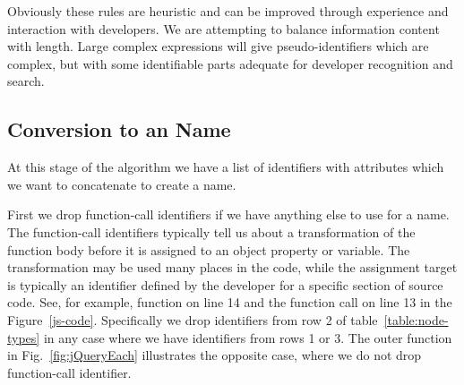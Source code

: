 \documentclass[10pt, preprint]{sigplanconf}
\begin{document}
Obviously these rules are heuristic and can be improved through experience and interaction with developers. We are attempting to balance information content with length. Large complex expressions will give pseudo-identifiers which are complex, but with some identifiable parts adequate for developer recognition and search.

\begin{table}
\centering
{}
\caption{JavaScript Expression Reduction to a Name. Expressions which match an entry in the pattern column are converted as shown in the Name column. Here \texttt{e} indicates an expression, \texttt{id} indicates an identifier, \texttt{+} means string concatenation and \texttt{Name()} means we apply the pattern matching recursively.}
\label{expression-reduction} 
\end{table}    

\subsection{Conversion to an Name}
\label{sec:concatenation}
At this stage of the algorithm we have a list of identifiers with attributes which we want to concatenate to create a name. 

First we drop function-call identifiers if we have anything else to use for a name. The function-call identifiers typically tell us about a transformation of the function body before it is assigned to an object property or variable. The transformation may be used many places in the code, while the assignment target is typically an identifier defined by the developer for a specific section of source code.  See, for example, function on line 14 and the function call on line 13 in the Figure~\ref{js-code}. Specifically we drop identifiers from row 2 of table~\ref{table:node-types} in any case where we have identifiers from rows 1 or 3.  The outer function in Fig.~\ref{fig:jQueryEach} illustrates the opposite case, where we do not drop function-call identifier. 
 
\end{document}
